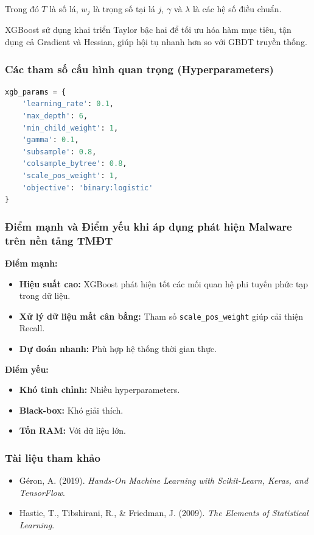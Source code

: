 Trong đó $T$ là số lá, $w_j$ là trọng số tại lá $j$, $\gamma$ và $\lambda$ là các hệ số điều chuẩn.

XGBoost sử dụng khai triển Taylor bậc hai để tối ưu hóa hàm mục tiêu, tận dụng cả Gradient và Hessian, giúp hội tụ nhanh hơn so với GBDT truyền thống.

\subsubsection{Các tham số cấu hình quan trọng (Hyperparameters)}

\begin{lstlisting}[language=Python, caption={Tham số XGBoost cho bài toán phân lớp}, label={lst:xgb_params}]
xgb_params = {
    'learning_rate': 0.1,
    'max_depth': 6,
    'min_child_weight': 1,
    'gamma': 0.1,
    'subsample': 0.8,
    'colsample_bytree': 0.8,
    'scale_pos_weight': 1,
    'objective': 'binary:logistic'
}
\end{lstlisting}

\subsubsection{Điểm mạnh và Điểm yếu khi áp dụng phát hiện Malware trên nền tảng TMĐT}

\textbf{Điểm mạnh:}
\begin{itemize}
    \item \textbf{Hiệu suất cao:} XGBoost phát hiện tốt các mối quan hệ phi tuyến phức tạp trong dữ liệu.
    \item \textbf{Xử lý dữ liệu mất cân bằng:} Tham số \texttt{scale\_pos\_weight} giúp cải thiện Recall.
    \item \textbf{Dự đoán nhanh:} Phù hợp hệ thống thời gian thực.
\end{itemize}

\textbf{Điểm yếu:}
\begin{itemize}
    \item \textbf{Khó tinh chỉnh:} Nhiều hyperparameters.
    \item \textbf{Black-box:} Khó giải thích.
    \item \textbf{Tốn RAM:} Với dữ liệu lớn.
\end{itemize}

\subsubsection*{Tài liệu tham khảo}
\begin{itemize}
    \item Géron, A. (2019). \textit{Hands-On Machine Learning with Scikit-Learn, Keras, and TensorFlow}.
    \item Hastie, T., Tibshirani, R., \& Friedman, J. (2009). \textit{The Elements of Statistical Learning}.
\end{itemize}